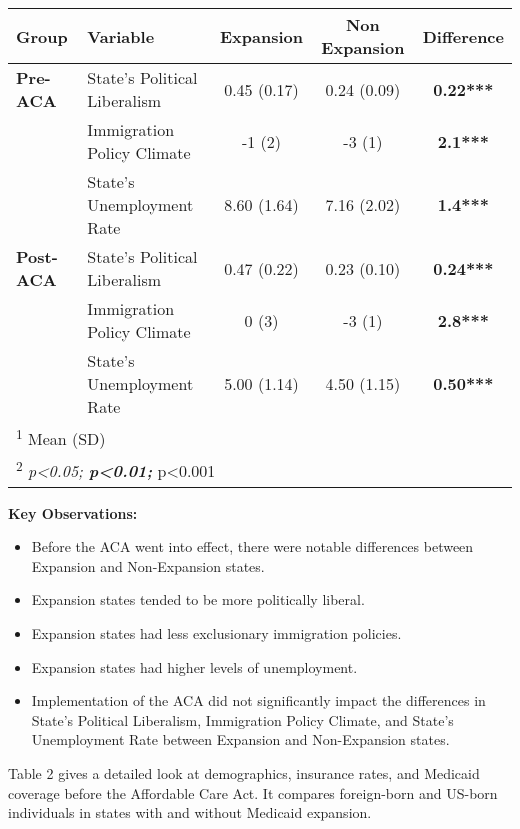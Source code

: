 \documentclass[
]{article}
\providecommand{\tightlist}{%
  \setlength{\itemsep}{0pt}\setlength{\parskip}{0pt}}
\let\origtable\table
\let\endorigtable\endtable
\renewenvironment{table}[1][ht]{
      \expandafter\origtable\expandafter[H]
    }{
      \endorigtable
    }
\begin{document}
\begin{table}[H]

\caption{\label{tab:tab1}Baseline Comparison of States}
\centering
\begin{tabular}[t]{>{}llccc}
\toprule
\textbf{Group} & \textbf{Variable} & \textbf{Expansion} & \textbf{Non Expansion} & \textbf{Difference}\\
\midrule
\textbf{Pre-ACA} & State's Political Liberalism & 0.45 (0.17) & 0.24 (0.09) & \textbf{0.22***}\\
\textbf{} & Immigration Policy Climate & -1 (2) & -3 (1) & \textbf{2.1***}\\
\textbf{} & State's Unemployment Rate & 8.60 (1.64) & 7.16 (2.02) & \textbf{1.4***}\\
\midrule
\textbf{Post-ACA} & State's Political Liberalism & 0.47 (0.22) & 0.23 (0.10) & \textbf{0.24***}\\
\textbf{} & Immigration Policy Climate & 0 (3) & -3 (1) & \textbf{2.8***}\\
\textbf{} & State's Unemployment Rate & 5.00 (1.14) & 4.50 (1.15) & \textbf{0.50***}\\
\bottomrule
\multicolumn{5}{l}{\rule{0pt}{1em}\textsuperscript{1} Mean (SD)}\\
\multicolumn{5}{l}{\rule{0pt}{1em}\textsuperscript{2} \textit{p<0.05; \textbf{p<0.01; }}p<0.001}\\
\end{tabular}
\end{table}

\textbf{Key Observations:}

\begin{itemize}
\tightlist
\item
  Before the ACA went into effect, there were notable differences
  between Expansion and Non-Expansion states.
\item
  Expansion states tended to be more politically liberal.
\item
  Expansion states had less exclusionary immigration policies.
\item
  Expansion states had higher levels of unemployment.
\item
  Implementation of the ACA did not significantly impact the differences
  in State's Political Liberalism, Immigration Policy Climate, and
  State's Unemployment Rate between Expansion and Non-Expansion states.
\end{itemize}

Table 2 gives a detailed look at demographics, insurance rates, and
Medicaid coverage before the Affordable Care Act. It compares
foreign-born and US-born individuals in states with and without Medicaid
expansion.
\end{document}

